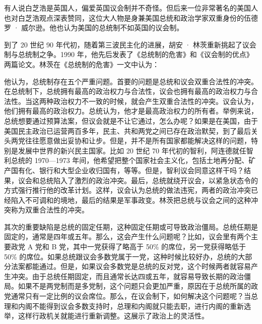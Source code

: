 有人说白芝浩是英国人，偏爱英国议会制并不奇怪。但后来一位非常著名的美国人也对白芝浩观点深表赞同，这位大人物是身兼美国总统和政治学家双重身份的伍德罗 · 威尔逊。他也认为美国的总统制不如英国的议会制。

到了 20 世纪 90 年代初，随着第三波民主化的进展，胡安 · 林茨重新挑起了议会制与总统制之争。1990 年，他先后发表了《总统制的危害》和《议会制的优点》两篇论文。林茨在《总统制的危害》一文中认为：


他认为，总统制存在五个严重问题。首要的问题是总统和议会双重合法性的冲突。在总统制下，总统拥有最高的政治权力与合法性，议会也拥有最高的政治权力与合法性。当这两种政治权力不一致的时候，就会产生双重合法性的冲突。议会认为，他们拥有最高的政治权力。总统认为，他才是最高政治权力的所有者。举例来说，总统想要通过预算法案，但议会就是不让它通过，怎么办呢？如果是在美国，由于美国民主政治已运营两百多年，民主、共和两党之间已存在政治默契，到了最后关头两党往往愿意做出妥协和让步。但是，并不是所有国家都能解决这样的问题，特别是发展中世界的新兴民主国家。比如 20 世纪 70 年代初的智利，阿连德就任智利总统的 1970—1973 年间，他希望把整个国家社会主义化，包括土地再分配、矿产国有化、银行和大型企业收归国有，等等。但是，智利议会同意这样干吗？结果，议会和总统陷入了激烈的政治冲突。最后，总统就绕开议会，以紧急状态令的方式强行推行他的改革计划。这样，议会认为总统的做法违宪，两者的政治冲突已经陷入不可调和的境地，最后的结果是军事政变。林茨把总统与议会之间的这种冲突称为双重合法性的冲突。

其次的重要缺陷是总统的固定任期，这种固定任期或可导致政治僵局。总统任期是固定的，通常是四年或五年。那么，这会产生什么问题呢？比如，议会里有两个主要政党 A 党和 B 党，其中一党获得了略高于 50\% 的席位，另一党获得略低于 50\% 的席位。如果总统跟议会多数党属于一党，这种时候比较好办，总统的大部分法案都能通过。但是，如果议会多数党是总统的反对党，这个时候两者就容易产生冲突。由于总统任期固定，而且通常长达四或五年，就容易导致长期的政治僵局。如果不是两党制而是多党制，这个问题只会更加严重，原因在于总统所属的政党通常只有一定比例的议会席位。那么，在议会制下，如何解决这个问题呢？当总理和内阁不能得到议会多数支持时，总理和内阁就只能去职，进行内阁的重新选举，这样行政机关就能进行重新调整。这展示了政治上的灵活性。

